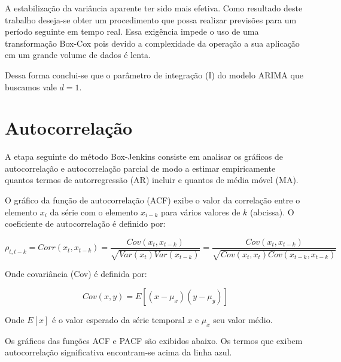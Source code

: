 \documentclass[
	12pt,				%
	openright,			%
	oneside,			%
	a4paper,			%
	english,			%
	french,				%
	spanish,			%
	brazil				%
	]{abntex2}
\begin{document}
A estabilização da variância aparente ter sido mais efetiva. Como resultado deste trabalho deseja-se obter um procedimento que possa realizar previsões para um período seguinte em tempo real. Essa exigência impede o uso de uma transformação Box-Cox pois devido a complexidade da operação a sua aplicação em um grande volume de dados é lenta.

Dessa forma conclui-se que o parâmetro de integração (I) do modelo ARIMA que buscamos vale $d=1$.

\section{Autocorrelação}

A etapa seguinte do método Box-Jenkins consiste em analisar os gráficos de autocorrelação e autocorrelação parcial de modo a estimar empiricamente quantos termos de autorregressão (AR) incluir e quantos de média móvel (MA).

O gráfico da função de autocorrelação (ACF) exibe o valor da correlação entre o elemento $x_i$ da série com o elemento $x_{i-k}$ para vários valores de $k$ (abcissa). O coeficiente de autocorrelação é definido por:

\begin{equation}
\rho_{t,t-k} = Corr(x_t, x_{t-k}) = \frac{Cov(x_t, x_{t-k})}{\sqrt{Var(x_t)Var(x_{t-k})}} = \frac{Cov(x_t, x_{t-k})}{\sqrt{Cov(x_t,x_t)Cov(x_{t-k},x_{t-k})}}
\end{equation}

Onde covariância (Cov) é definida por:

\begin{equation}
Cov(x,y) = E\left[(x-\mu_x)(y-\mu_y)\right]
\end{equation}

Onde $E[x]$ é o valor esperado da série temporal $x$ e $\mu_x$ seu valor médio.

Os gráficos das funções ACF e PACF são exibidos abaixo. Os termos que exibem autocorrelação significativa encontram-se acima da linha azul.
\end{document}
